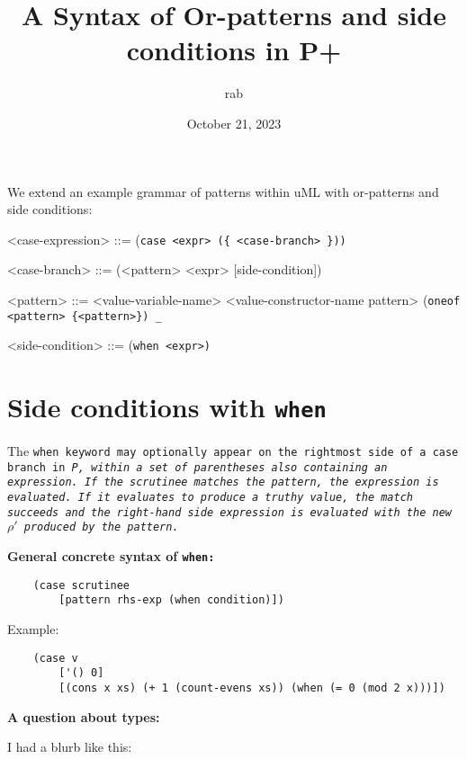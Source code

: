 \documentclass[]{article}
\title{A Syntax of Or-patterns and side conditions in P+}
\author{rab}
\date{October 21, 2023}
\begin{document}
\maketitle


We extend an example grammar of patterns within uML with 
or-patterns and side conditions: 

\bigskip

\begin{grammar}
    <case-expression> ::= (\tt{case} <expr> (\{ <case-branch> \}))
    
    <case-branch> ::= (<pattern> <expr> [side-condition])
    
    <pattern> ::= <value-variable-name>
    \alt <value-constructor-name {pattern}>
    \alt (\tt{oneof} <pattern> \{<pattern>\})
    \alt \texttt{_}
    
    <side-condition> ::= (\tt{when} <expr>)
\end{grammar}

\bigskip

\section{Side conditions with \tt{when}}

The \tt{when} keyword may optionally appear on the rightmost side of a \tt{case}
branch in \it{P}, within a set of parentheses also containing an expression.
If the scrutinee matches the pattern, the expression is evaluated. If it 
evaluates to produce a truthy value, the match succeeds and the right-hand
side expression is evaluated with the new $\rho'$ produced by the pattern.

\medskip

\bf{General concrete syntax of \tt{when}: }

\begin{verbatim}
    (case scrutinee
        [pattern rhs-exp (when condition)])
\end{verbatim}


Example: 
\begin{verbatim}
    (case v
        ['() 0]
        [(cons x xs) (+ 1 (count-evens xs)) (when (= 0 (mod 2 x)))])
\end{verbatim}

\bf{A question about types:}
\medskip

I had a blurb like this: 

\medskip
\end{document}

